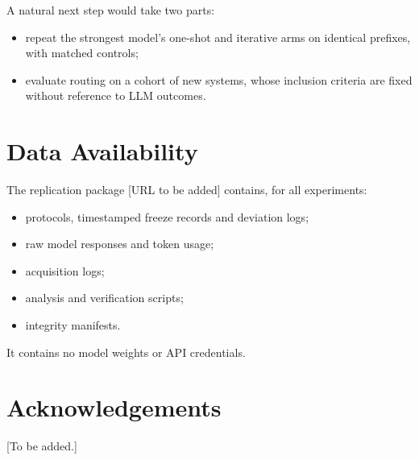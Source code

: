 A natural next step would take two parts:
\begin{itemize}
  \item repeat the strongest model's one-shot and iterative arms on identical prefixes, with matched controls;
  \item evaluate routing on a cohort of new systems, whose inclusion criteria are fixed without reference to LLM outcomes.
\end{itemize}

\section*{Data Availability}

The replication package [URL to be added] contains, for all experiments:
\begin{itemize}
  \item protocols, timestamped freeze records and deviation logs;
  \item raw model responses and token usage;
  \item acquisition logs;
  \item analysis and verification scripts;
  \item integrity manifests.
\end{itemize}
It contains no model weights or API credentials.

\section*{Acknowledgements}

[To be added.]





